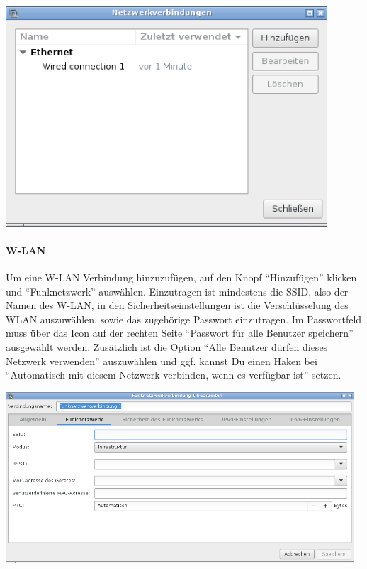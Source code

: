 \documentclass[a4paper,12pt,twoside]{article}
\begin{document}
\bigskip
\begin{minipage}{\linewidth}
    \centering
    \captionsetup{type=figure}
    \includegraphics[width=12cm]{screenshots/network_manager.png}
    \label{fig:dialog_netzwerk}
\end{minipage}


\paragraph{W-LAN}
\label{sct:wifi}
Um eine W-LAN Verbindung hinzuzufügen, auf den Knopf "`Hinzufügen"' klicken
und "`Funknetzwerk"' auswählen. Einzutragen ist
mindestens die SSID, also der Namen des W-LAN, in den
Sicherheitseinstellungen ist die Verschlüsselung des WLAN auszuwählen,
sowie das zugehörige Passwort einzutragen. Im Passwortfeld muss über das 
Icon auf der rechten Seite "`Passwort für alle Benutzer speichern"' 
ausgewählt werden. Zusätzlich ist die Option "`Alle Benutzer dürfen 
dieses Netzwerk verwenden"' auszuwählen und ggf. kannst Du einen
Haken bei "`Automatisch mit diesem Netzwerk verbinden, wenn es 
verfügbar ist"' setzen.

\bigskip
\begin{minipage}{\linewidth}
    \centering
    \captionsetup{type=figure}
    \includegraphics[width=13cm]{screenshots/network_manager_wifi.png}
    \label{fig:wifi}
\end{minipage}
\bigskip
\end{document}
